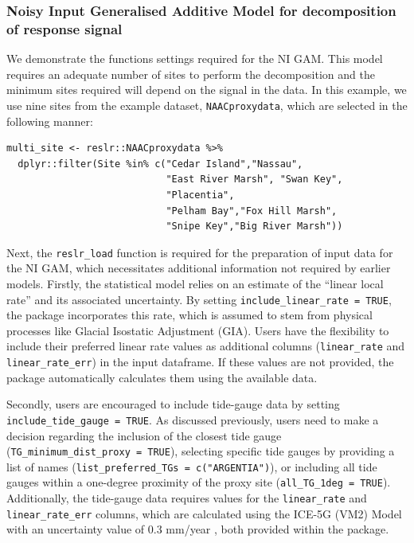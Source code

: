 \subsubsection{Noisy Input Generalised Additive Model for decomposition of response signal}\label{casestudy2nigam}

We demonstrate the functions settings required for the NI GAM. This model requires an adequate number of sites to perform the decomposition and the minimum sites required will depend on the signal in the data. In this example, we use nine sites from the example dataset, \texttt{NAACproxydata}, which are selected in the following manner:
\scriptsize

\begin{verbatim}
multi_site <- reslr::NAACproxydata %>% 
  dplyr::filter(Site %in% c("Cedar Island","Nassau",
                            "East River Marsh", "Swan Key",
                            "Placentia",
                            "Pelham Bay","Fox Hill Marsh",
                            "Snipe Key","Big River Marsh"))
\end{verbatim}

\normalsize

Next, the \texttt{reslr\_load} function is required for the preparation of input data for the NI GAM, which necessitates additional information not required by earlier models. Firstly, the statistical model relies on an estimate of the ``linear local rate'' and its associated uncertainty. By setting \texttt{include\_linear\_rate\ =\ TRUE}, the package incorporates this rate, which is assumed to stem from physical processes like Glacial Isostatic Adjustment (GIA). Users have the flexibility to include their preferred linear rate values as additional columns (\texttt{linear\_rate} and \texttt{linear\_rate\_err}) in the input dataframe. If these values are not provided, the package automatically calculates them using the available data.

Secondly, users are encouraged to include tide-gauge data by setting \texttt{include\_tide\_gauge\ =\ TRUE}. As discussed previously, users need to make a decision regarding the inclusion of the closest tide gauge (\texttt{TG\_minimum\_dist\_proxy\ =\ TRUE}), selecting specific tide gauges by providing a list of names (\texttt{list\_preferred\_TGs\ =\ c("ARGENTIA")}), or including all tide gauges within a one-degree proximity of the proxy site (\texttt{all\_TG\_1deg\ =\ TRUE}). Additionally, the tide-gauge data requires values for the \texttt{linear\_rate} and \texttt{linear\_rate\_err} columns, which are calculated using the ICE-5G (VM2) Model \citep{Peltier2004} with an uncertainty value of 0.3 mm/year \citep{Engelhart2009}, both provided within the  package.

